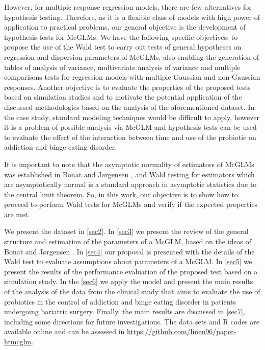 \documentclass[USenglish]{article}
\theoremstyle{dgthm}
\theoremstyle{dgdef}
\begin{document}
However, for multiple response regression models, there are few alternatives for hypothesis testing. Therefore, as it is a flexible class of models with high power of application to practical problems, our general objective is the development of hypothesis tests for McGLMs. We have the following specific objectives: to propose the use of the Wald test to carry out tests of general hypotheses on regression and dispersion parameters of McGLMs, also enabling the generation of tables of analysis of variance, multivariate analysis of variance and multiple comparisons tests for regression models with multiple Gaussian and non-Gaussian responses. Another objective is to evaluate the properties of the proposed tests based on simulation studies and to motivate the potential application of the discussed methodologies based on the analysis of the aforementioned dataset. In the case study, standard modeling techniques would be difficult to apply, however it is a problem of possible analysis via McGLM and hypothesis tests can be used to evaluate the effect of the interaction between time and use of the probiotic on addiction and binge eating disorder.

It is important to note that the asymptotic normality of estimators of McGLMs was established in Bonat and Jørgensen \cite{Bonat16}, and Wald testing for estimators which are asymptotically normal is a standard approach in asymptotic statistics due to the central limit theorem. So, in this work, our objective is to show how to proceed to perform Wald tests for McGLMs and verify if the expected properties are met.


We present the dataset in \autoref{sec2}. In \autoref{sec3} we present the review of the general structure and estimation of the parameters of a McGLM, based on the ideas of Bonat and Jørgensen \cite{Bonat16}. In \autoref{sec4} our proposal is presented with the details of the Wald test to evaluate assumptions about parameters of a McGLM. In \autoref{sec5} we present the results of the performance evaluation of the proposed test based on a simulation study. In the \autoref{sec6} we apply the model and present the main results of the analysis of the data from the clinical study that aims to evaluate the use of probiotics in the control of addiction and binge eating disorder in patients undergoing bariatric surgery. Finally, the main results are discussed in \autoref{sec7}, including some directions for future investigations. The data sets and R codes are available online and can be assessed in \href{https://github.com/lineu96/paper-htmcglm}{https://github.com/lineu96/paper-htmcglm}.
\end{document}
